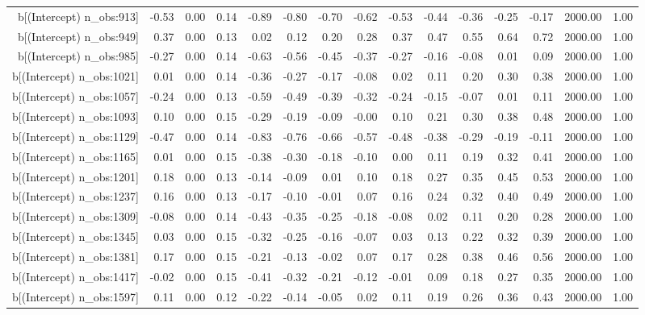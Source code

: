 \begin{table}[ht]
\begin{tabular}{rrrrrrrrrrrrrrr}
  b[(Intercept) n\_obs:913] & -0.53 & 0.00 & 0.14 & -0.89 & -0.80 & -0.70 & -0.62 & -0.53 & -0.44 & -0.36 & -0.25 & -0.17 & 2000.00 & 1.00 \\ 
  b[(Intercept) n\_obs:949] & 0.37 & 0.00 & 0.13 & 0.02 & 0.12 & 0.20 & 0.28 & 0.37 & 0.47 & 0.55 & 0.64 & 0.72 & 2000.00 & 1.00 \\ 
  b[(Intercept) n\_obs:985] & -0.27 & 0.00 & 0.14 & -0.63 & -0.56 & -0.45 & -0.37 & -0.27 & -0.16 & -0.08 & 0.01 & 0.09 & 2000.00 & 1.00 \\ 
  b[(Intercept) n\_obs:1021] & 0.01 & 0.00 & 0.14 & -0.36 & -0.27 & -0.17 & -0.08 & 0.02 & 0.11 & 0.20 & 0.30 & 0.38 & 2000.00 & 1.00 \\ 
  b[(Intercept) n\_obs:1057] & -0.24 & 0.00 & 0.13 & -0.59 & -0.49 & -0.39 & -0.32 & -0.24 & -0.15 & -0.07 & 0.01 & 0.11 & 2000.00 & 1.00 \\ 
  b[(Intercept) n\_obs:1093] & 0.10 & 0.00 & 0.15 & -0.29 & -0.19 & -0.09 & -0.00 & 0.10 & 0.21 & 0.30 & 0.38 & 0.48 & 2000.00 & 1.00 \\ 
  b[(Intercept) n\_obs:1129] & -0.47 & 0.00 & 0.14 & -0.83 & -0.76 & -0.66 & -0.57 & -0.48 & -0.38 & -0.29 & -0.19 & -0.11 & 2000.00 & 1.00 \\ 
  b[(Intercept) n\_obs:1165] & 0.01 & 0.00 & 0.15 & -0.38 & -0.30 & -0.18 & -0.10 & 0.00 & 0.11 & 0.19 & 0.32 & 0.41 & 2000.00 & 1.00 \\ 
  b[(Intercept) n\_obs:1201] & 0.18 & 0.00 & 0.13 & -0.14 & -0.09 & 0.01 & 0.10 & 0.18 & 0.27 & 0.35 & 0.45 & 0.53 & 2000.00 & 1.00 \\ 
  b[(Intercept) n\_obs:1237] & 0.16 & 0.00 & 0.13 & -0.17 & -0.10 & -0.01 & 0.07 & 0.16 & 0.24 & 0.32 & 0.40 & 0.49 & 2000.00 & 1.00 \\ 
  b[(Intercept) n\_obs:1309] & -0.08 & 0.00 & 0.14 & -0.43 & -0.35 & -0.25 & -0.18 & -0.08 & 0.02 & 0.11 & 0.20 & 0.28 & 2000.00 & 1.00 \\ 
  b[(Intercept) n\_obs:1345] & 0.03 & 0.00 & 0.15 & -0.32 & -0.25 & -0.16 & -0.07 & 0.03 & 0.13 & 0.22 & 0.32 & 0.39 & 2000.00 & 1.00 \\ 
  b[(Intercept) n\_obs:1381] & 0.17 & 0.00 & 0.15 & -0.21 & -0.13 & -0.02 & 0.07 & 0.17 & 0.28 & 0.38 & 0.46 & 0.56 & 2000.00 & 1.00 \\ 
  b[(Intercept) n\_obs:1417] & -0.02 & 0.00 & 0.15 & -0.41 & -0.32 & -0.21 & -0.12 & -0.01 & 0.09 & 0.18 & 0.27 & 0.35 & 2000.00 & 1.00 \\ 
  b[(Intercept) n\_obs:1597] & 0.11 & 0.00 & 0.12 & -0.22 & -0.14 & -0.05 & 0.02 & 0.11 & 0.19 & 0.26 & 0.36 & 0.43 & 2000.00 & 1.00 \\ 

\end{tabular}
\end{table}
